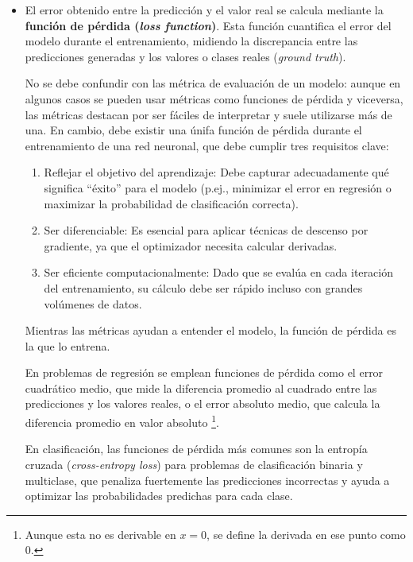 \begin{itemize}

    \item El error obtenido entre la predicción y el valor real se calcula mediante la \textbf{función de 
    pérdida (\textit{loss function})}. Esta función cuantifica el error del modelo durante el entrenamiento, 
    midiendo la discrepancia entre las predicciones generadas y los valores o clases reales (\textit{ground 
    truth}).

    No se debe confundir con las métrica de evaluación de un modelo: aunque en algunos casos se pueden usar 
    métricas como funciones de pérdida y viceversa, las métricas destacan por ser fáciles de interpretar 
    y suele utilizarse más de una. En cambio, debe existir una únifa función de pérdida durante el 
    entrenamiento de una red neuronal, que debe cumplir tres requisitos clave:

    \begin{enumerate}

        \item Reflejar el objetivo del aprendizaje: Debe capturar adecuadamente qué significa ``éxito'' para 
        el modelo (p.ej., minimizar el error en regresión o maximizar la probabilidad de clasificación 
        correcta).

        \item Ser diferenciable: Es esencial para aplicar técnicas de descenso por gradiente, ya que el 
        optimizador necesita calcular derivadas.

        \item Ser eficiente computacionalmente: Dado que se evalúa en cada iteración del entrenamiento, su 
        cálculo debe ser rápido incluso con grandes volúmenes de datos.

    \end{enumerate}

    Mientras las métricas ayudan a entender el modelo, la función de pérdida es la que lo entrena.

    En problemas de regresión se emplean funciones de pérdida como el error cuadrático medio, que mide la 
    diferencia promedio al cuadrado entre las predicciones y los valores reales, o el error absoluto medio, 
    que calcula la diferencia promedio en valor absoluto%
    \footnote{
        Aunque esta no es derivable en $x=0$, se define la derivada en ese punto como 0.
    }.

    En clasificación, las funciones de pérdida más comunes son la entropía cruzada (\textit{cross-entropy 
    loss}) para problemas de clasificación binaria y multiclase, que penaliza fuertemente las predicciones 
    incorrectas y ayuda a optimizar las probabilidades predichas para cada clase.



\end{itemize}
